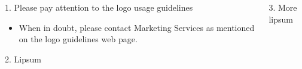 \documentclass[final]{beamer}
\begin{document}
\begin{frame}{}
\begin{columns}
\begin{column}{0.49\textwidth}
\begin{block}{1. Please pay attention to the logo usage guidelines}
\begin{itemize}
          \item When in doubt, please contact \alert{Marketing Services} as mentioned on the logo guidelines web page.
        \end{itemize}
      \end{block}
      \begin{block}{2. Lipsum}
        \lipsum[1-2]
      \end{block}
    \end{column}
    \begin{column}{0.49\textwidth}
      \begin{block}{3. More lipsum}
        \lipsum[3-5]
      \end{block}
    \end{column}
  \end{columns}
\end{frame}
\end{document}

